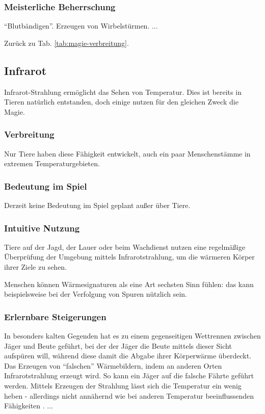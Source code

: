 \subsubsection{Meisterliche Beherrschung} 
\begin{outline}
	\1 "`Blutbändigen"'.
	\1 Erzeugen von Wirbelstürmen.
	\1 ...
\end{outline}
Zurück zu Tab. \ref{tab:magie-verbreitung}.



\subsection{Infrarot}\label{magie:infrarot}
Infrarot-Strahlung ermöglicht das Sehen von Temperatur. 
Dies ist bereits in Tieren natürlich entstanden, doch einige nutzen für den gleichen Zweck die Magie.

\subsubsection{Verbreitung}
Nur Tiere haben diese Fähigkeit entwickelt, auch ein paar Menschenstämme in extremen Temperaturgebieten.

\subsubsection{Bedeutung im Spiel}
Derzeit keine Bedeutung im Spiel geplant außer über Tiere.

\subsubsection{Intuitive Nutzung}
Tiere auf der Jagd, der Lauer oder beim Wachdienst nutzen eine regelmäßige Überprüfung der Umgebung mittels Infrarotstrahlung, um die wärmeren Körper ihrer Ziele zu sehen.

Menschen können Wärmesignaturen als eine Art sechsten Sinn fühlen: das kann beispielsweise bei der Verfolgung von Spuren nützlich sein.

\subsubsection{Erlernbare Steigerungen}
\begin{outline}
	\1 In besonders kalten Gegenden hat es zu einem gegenseitigen Wettrennen zwischen Jäger und Beute geführt, bei der der Jäger die Beute mittels dieser Sicht aufspüren will, während diese damit die Abgabe ihrer Körperwärme überdeckt.
	\1 Das Erzeugen von "`falschen"' Wärmebildern, indem an anderen Orten Infrarotstrahlung erzeugt wird.
	So kann \zB ein Jäger auf die falsche Fährte geführt werden.
	\1 Mittels Erzeugen der Strahlung lässt sich die Temperatur ein wenig heben - allerdings nicht annähernd wie bei anderen Temperatur beeinflussenden Fähigkeiten .
	\1 ...
\end{outline}

